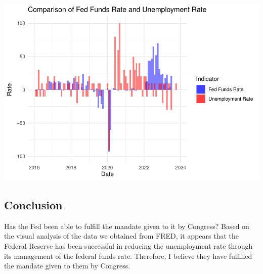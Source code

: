 \documentclass[
]{article}
\begin{document}
\includegraphics{Story_2_Joe_Garcia_files/figure-latex/unnamed-chunk-10-1.pdf}

\subsection{Conclusion}\label{conclusion}

Has the Fed been able to fulfill the mandate given to it by Congress?
Based on the visual analysis of the data we obtained from FRED, it
appears that the Federal Reserve has been successful in reducing the
unemployment rate through its management of the federal funds rate.
Therefore, I believe they have fulfilled the mandate given to them by
Congress.
\end{document}
